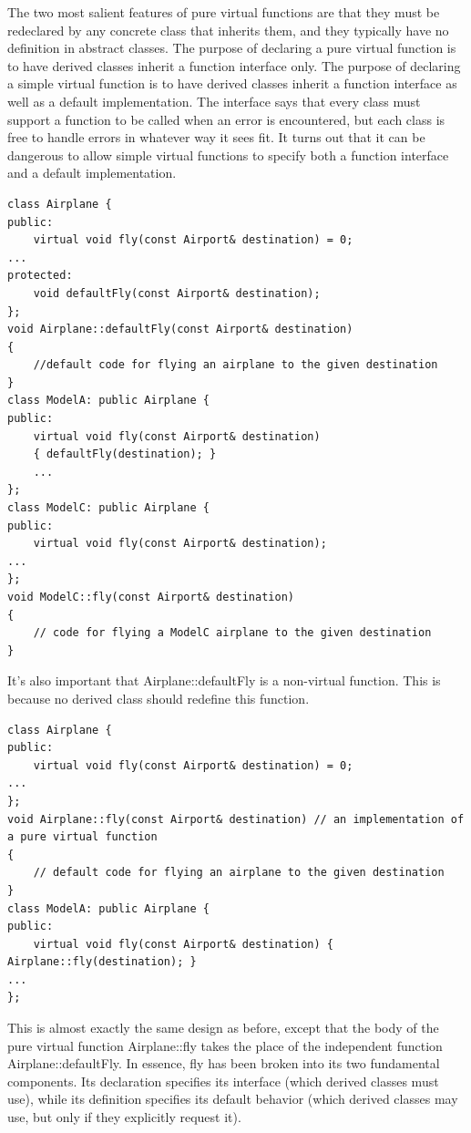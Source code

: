 \documentclass[a4paper,12pt,notitlepage]{article}
\begin{document}
The two most salient features of pure virtual functions are that they must be redeclared by any concrete class that inherits them, and they typically have no definition in abstract classes. The purpose of declaring a pure virtual function is to have derived classes inherit a function interface only. The purpose of declaring a simple virtual function is to have derived classes inherit a function interface as well as a default implementation. The interface says that every class must support a function to be
called when an error is encountered, but each class is free to handle errors in whatever way it sees fit. It turns out that it can be dangerous to allow simple virtual functions to specify both a function interface and a default implementation.

\begin{verbatim}
class Airplane {
public:
    virtual void fly(const Airport& destination) = 0;
...
protected:
    void defaultFly(const Airport& destination);
};
void Airplane::defaultFly(const Airport& destination)
{
    //default code for flying an airplane to the given destination
}
class ModelA: public Airplane {
public:
    virtual void fly(const Airport& destination)
    { defaultFly(destination); }
    ...
};
class ModelC: public Airplane {
public:
    virtual void fly(const Airport& destination);
...
};
void ModelC::fly(const Airport& destination)
{
    // code for flying a ModelC airplane to the given destination
}
\end{verbatim}

It's also important that Airplane::defaultFly is a non-virtual function. This is because no derived class should redefine this function.

\begin{verbatim}
class Airplane {
public:
    virtual void fly(const Airport& destination) = 0;
...
};
void Airplane::fly(const Airport& destination) // an implementation of a pure virtual function
{
    // default code for flying an airplane to the given destination
}
class ModelA: public Airplane {
public:
    virtual void fly(const Airport& destination) { Airplane::fly(destination); }
...
};
\end{verbatim}

This is almost exactly the same design as before, except that the body of the pure virtual function Airplane::fly takes the place of the independent function Airplane::defaultFly. In essence, fly has been broken into its two fundamental components. Its declaration specifies its interface (which derived classes must use), while its definition specifies its default behavior (which derived classes may use, but only if they explicitly request it).
\end{document}
